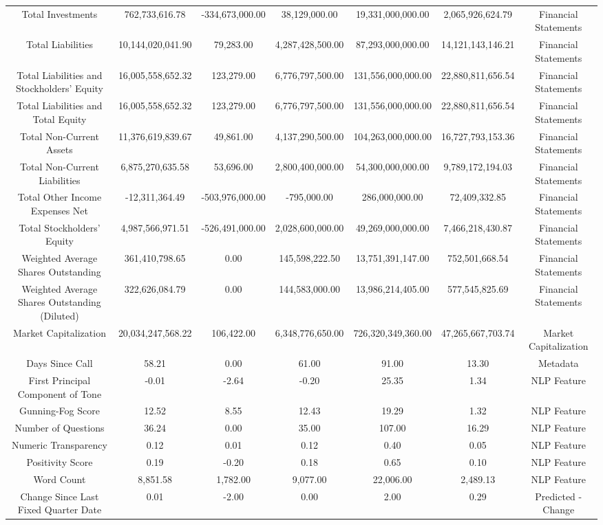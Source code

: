 \begin{longtable}{ccccccc}
Total Investments & 762,733,616.78 & -334,673,000.00 & 38,129,000.00 & 19,331,000,000.00 & 2,065,926,624.79 & Financial Statements \\
Total Liabilities & 10,144,020,041.90 & 79,283.00 & 4,287,428,500.00 & 87,293,000,000.00 & 14,121,143,146.21 & Financial Statements \\
Total Liabilities and Stockholders' Equity & 16,005,558,652.32 & 123,279.00 & 6,776,797,500.00 & 131,556,000,000.00 & 22,880,811,656.54 & Financial Statements \\
Total Liabilities and Total Equity & 16,005,558,652.32 & 123,279.00 & 6,776,797,500.00 & 131,556,000,000.00 & 22,880,811,656.54 & Financial Statements \\
Total Non-Current Assets & 11,376,619,839.67 & 49,861.00 & 4,137,290,500.00 & 104,263,000,000.00 & 16,727,793,153.36 & Financial Statements \\
Total Non-Current Liabilities & 6,875,270,635.58 & 53,696.00 & 2,800,400,000.00 & 54,300,000,000.00 & 9,789,172,194.03 & Financial Statements \\
Total Other Income Expenses Net & -12,311,364.49 & -503,976,000.00 & -795,000.00 & 286,000,000.00 & 72,409,332.85 & Financial Statements \\
Total Stockholders' Equity & 4,987,566,971.51 & -526,491,000.00 & 2,028,600,000.00 & 49,269,000,000.00 & 7,466,218,430.87 & Financial Statements \\
Weighted Average Shares Outstanding & 361,410,798.65 & 0.00 & 145,598,222.50 & 13,751,391,147.00 & 752,501,668.54 & Financial Statements \\
Weighted Average Shares Outstanding (Diluted) & 322,626,084.79 & 0.00 & 144,583,000.00 & 13,986,214,405.00 & 577,545,825.69 & Financial Statements \\
Market Capitalization & 20,034,247,568.22 & 106,422.00 & 6,348,776,650.00 & 726,320,349,360.00 & 47,265,667,703.74 & Market Capitalization \\
Days Since Call & 58.21 & 0.00 & 61.00 & 91.00 & 13.30 & Metadata \\
First Principal Component of Tone & -0.01 & -2.64 & -0.20 & 25.35 & 1.34 & NLP Feature \\
Gunning-Fog Score & 12.52 & 8.55 & 12.43 & 19.29 & 1.32 & NLP Feature \\
Number of Questions & 36.24 & 0.00 & 35.00 & 107.00 & 16.29 & NLP Feature \\
Numeric Transparency & 0.12 & 0.01 & 0.12 & 0.40 & 0.05 & NLP Feature \\
Positivity Score & 0.19 & -0.20 & 0.18 & 0.65 & 0.10 & NLP Feature \\
Word Count & 8,851.58 & 1,782.00 & 9,077.00 & 22,006.00 & 2,489.13 & NLP Feature \\
Change Since Last Fixed Quarter Date & 0.01 & -2.00 & 0.00 & 2.00 & 0.29 & Predicted - Change \\
\end{longtable}
\normalsize
